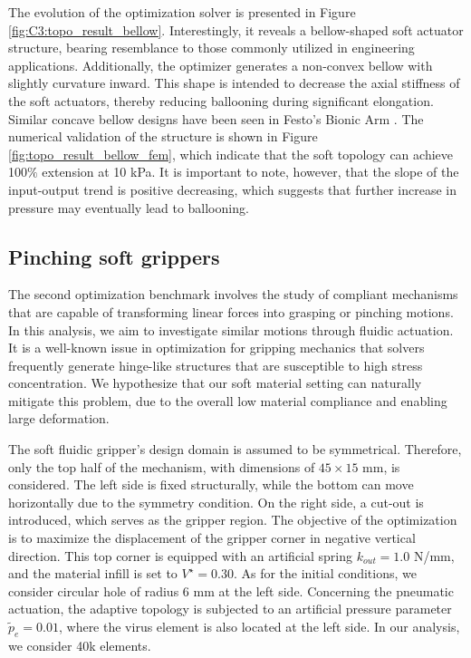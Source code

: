 The evolution of the optimization solver is presented in Figure \ref{fig:C3:topo_result_bellow}. Interestingly, it reveals a bellow-shaped soft actuator structure, bearing resemblance to those commonly utilized in engineering applications. Additionally, the optimizer generates a non-convex bellow with  slightly curvature inward. This shape is intended to decrease the axial stiffness of the soft actuators, thereby reducing ballooning during significant elongation. Similar concave bellow designs have been seen in Festo's Bionic Arm \cite{Hairer2002}. The numerical validation of the structure is shown in Figure \ref{fig:topo_result_bellow_fem}, which indicate that the soft topology can achieve 100$\%$ extension at 10 \si{\kilo \pascal}. It is important to note, however, that the slope of the input-output trend is positive decreasing, which suggests that further increase in pressure may eventually lead to ballooning.

\subsection{Pinching soft grippers}
The second optimization benchmark involves the study of compliant mechanisms that are capable of transforming linear forces into grasping or pinching motions. In this analysis, we aim to investigate similar motions through fluidic actuation. It is a well-known issue in optimization for gripping mechanics that solvers frequently generate hinge-like structures that are susceptible to high stress concentration. We hypothesize that our soft material setting can naturally mitigate this problem, due to the overall low material compliance and enabling large deformation.

The soft fluidic gripper's design domain is assumed to be symmetrical. Therefore, only the top half of the mechanism, with dimensions of $45 \times 15$ \si{\milli \meter}, is considered. The left side is fixed structurally, while the bottom can move horizontally due to the symmetry condition. On the right side, a cut-out is introduced, which serves as the gripper region. The objective of the optimization is to maximize the displacement of the gripper corner in negative vertical direction. This top corner is equipped with an artificial spring $k_{out} = 1.0$ N/mm, and the material infill is set to $V^\star = 0.30$. As for the initial conditions, we consider circular hole of radius $6$ \si{\milli \meter} at the left side. Concerning the pneumatic actuation, the adaptive topology is subjected to an artificial pressure parameter $\tilde{p}_e = 0.01$, where the virus element is also located at the left side. In our analysis, we consider 40k elements.

